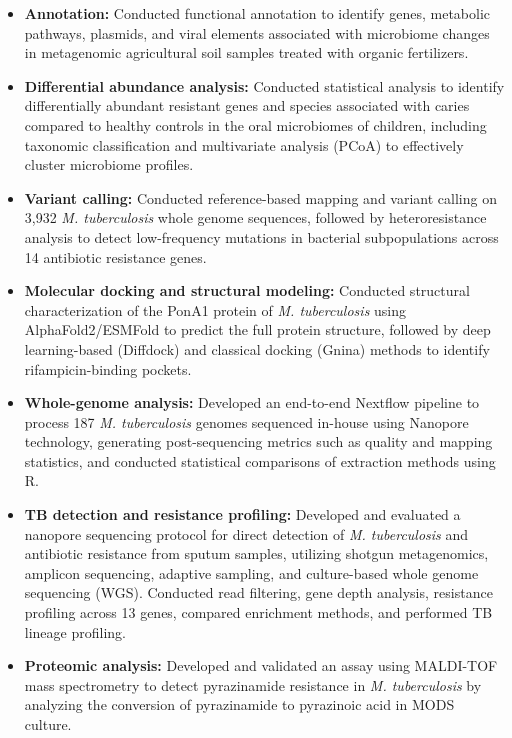 \documentclass[11pt,a4paper,sans]{moderncv}
\begin{document}
  \cventry{}{}
  {}{}{}
  {\begin{itemize}%
    \item \textbf{Annotation:} {\footnotesize Conducted functional annotation to identify genes, metabolic pathways, plasmids, and viral elements associated with microbiome changes in metagenomic agricultural soil samples treated with organic fertilizers.}
    \item \textbf{Differential abundance analysis:} {\footnotesize Conducted statistical analysis to identify differentially abundant resistant genes and species associated with caries compared to healthy controls in the oral microbiomes of children, including taxonomic classification and multivariate analysis (PCoA) to effectively cluster microbiome profiles.}
    \item \textbf{Variant calling:} {\footnotesize Conducted reference-based mapping and variant calling on 3,932 \textit{M. tuberculosis} whole genome sequences, followed by heteroresistance analysis to detect low-frequency mutations in bacterial subpopulations across 14 antibiotic resistance genes.}
    \item \textbf{Molecular docking and structural modeling:} {\footnotesize Conducted structural characterization of the PonA1 protein of \textit{M. tuberculosis} using AlphaFold2/ESMFold to predict the full protein structure, followed by deep learning-based (Diffdock) and classical docking (Gnina) methods to identify rifampicin-binding pockets.}
    \item \textbf{Whole-genome analysis:} {\footnotesize Developed an end-to-end Nextflow pipeline to process 187 \textit{M. tuberculosis} genomes sequenced in-house using Nanopore technology, generating post-sequencing metrics such as quality and mapping statistics, and conducted statistical comparisons of extraction methods using R.}
    \item \textbf{TB detection and resistance profiling:} {\footnotesize Developed and evaluated a nanopore sequencing protocol for direct detection of \textit{M. tuberculosis} and antibiotic resistance from sputum samples, utilizing shotgun metagenomics, amplicon sequencing, adaptive sampling, and culture-based whole genome sequencing (WGS). Conducted read filtering, gene depth analysis, resistance profiling across 13 genes, compared enrichment methods, and performed TB lineage profiling.}
    \item \textbf{Proteomic analysis:} {\footnotesize Developed and validated an assay using MALDI-TOF mass spectrometry to detect pyrazinamide resistance in \textit{M. tuberculosis} by analyzing the conversion of pyrazinamide to pyrazinoic acid in MODS culture.}

\end{itemize}}
\end{document}
